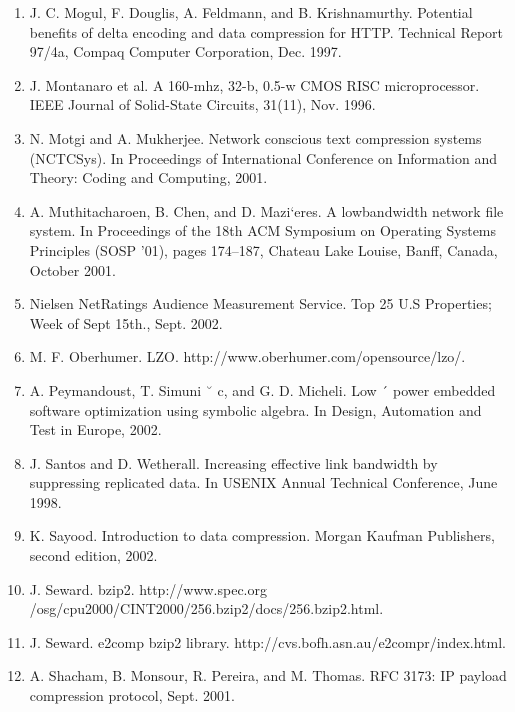 \documentclass{article}
\begin{document}
\begin{enumerate}
	\item J. C. Mogul, F. Douglis, A. Feldmann, and B. Krishnamurthy. Potential benefits of delta encoding and data
	compression for HTTP. Technical Report 97/4a, Compaq Computer Corporation, Dec. 1997.

	\item J. Montanaro et al. A 160-mhz, 32-b, 0.5-w CMOS RISC
	microprocessor. IEEE Journal of Solid-State Circuits,
	31(11), Nov. 1996.

	\item N. Motgi and A. Mukherjee. Network conscious text
	compression systems (NCTCSys). In Proceedings of
	International Conference on Information and Theory:
	Coding and Computing, 2001.

	\item A. Muthitacharoen, B. Chen, and D. Mazi`eres. A lowbandwidth network file system. In Proceedings of the
	18th ACM Symposium on Operating Systems Principles (SOSP ’01), pages 174–187, Chateau Lake Louise,
	Banff, Canada, October 2001.

	\item Nielsen NetRatings Audience Measurement Service. Top
	25 U.S Properties; Week of Sept 15th., Sept. 2002.
	
	\item M. F. Oberhumer. LZO.
	http://www.oberhumer.com/opensource/lzo/.

	\item A. Peymandoust, T. Simuni ˘ c, and G. D. Micheli. Low ´
	power embedded software optimization using symbolic
	algebra. In Design, Automation and Test in Europe, 2002.

	\item J. Santos and D. Wetherall. Increasing effective link
	bandwidth by suppressing replicated data. In USENIX
	Annual Technical Conference, June 1998.

	\item K. Sayood. Introduction to data compression. Morgan
	Kaufman Publishers, second edition, 2002.

	\item J. Seward. bzip2. http://www.spec.org
	/osg/cpu2000/CINT2000/256.bzip2/docs/256.bzip2.html.

	\item J. Seward. e2comp bzip2 library.
	http://cvs.bofh.asn.au/e2compr/index.html.

	\item A. Shacham, B. Monsour, R. Pereira, and M. Thomas.
	RFC 3173: IP payload compression protocol, Sept. 2001.


\end{enumerate}
\end{document}
